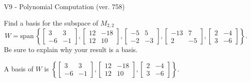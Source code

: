 \begin{exercise}
  \begin{exerciseTitle}V9 - Polynomial Computation (ver. 758)\end{exerciseTitle}
  \begin{exerciseStatement}
    Find a basis for the subspace of \(M_{2,2}\) 
\[W=\mathrm{span}\ \left\{\left[\begin{array}{cc}
3 & 3 \\
-6 & -1
\end{array}\right] , \left[\begin{array}{cc}
12 & -18 \\
12 & 10
\end{array}\right] , \left[\begin{array}{cc}
-5 & 5 \\
-2 & -3
\end{array}\right] , \left[\begin{array}{cc}
-13 & 7 \\
2 & -5
\end{array}\right] , \left[\begin{array}{cc}
2 & -4 \\
3 & -6
\end{array}\right]\right\}.\]
 Be sure to explain why your result is a basis.


  \end{exerciseStatement}
  \begin{exerciseAnswer}
   A basis of \(W\) is  \(\left\{\left[\begin{array}{cc}
3 & 3 \\
-6 & -1
\end{array}\right] , \left[\begin{array}{cc}
12 & -18 \\
12 & 10
\end{array}\right] , \left[\begin{array}{cc}
2 & -4 \\
3 & -6
\end{array}\right]\right\}\).
  


  \end{exerciseAnswer}
\end{exercise}